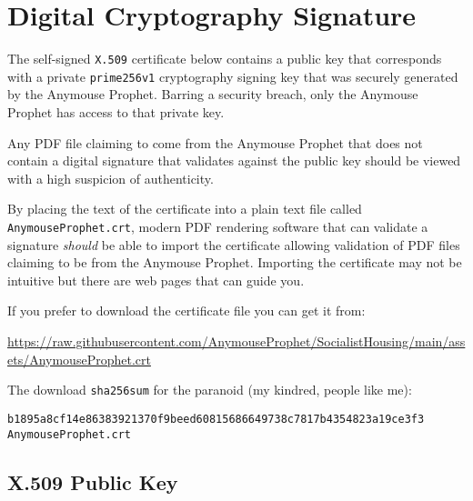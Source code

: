 \cleardoublepage %
\section*{Digital Cryptography Signature}
\hypertarget{cryptsig}{}


The self-signed \texttt{X.509} certificate below contains a public key that corresponds with a private \texttt{prime256v1} cryptography signing key that was securely generated by the Anymouse Prophet. Barring a security breach, only the Anymouse Prophet has access to that private key.

Any PDF file claiming to come from the Anymouse Prophet that does not contain a digital signature that validates against the public key should be viewed with a high suspicion of authenticity.

By placing the text of the certificate into a plain text file called \texttt{AnymouseProphet.crt}, modern PDF rendering software that can validate a signature \emph{should} be able to import the certificate allowing validation of PDF files claiming to be from the Anymouse Prophet. Importing the certificate may not be intuitive but there are web pages that can guide you.

If you prefer to download the certificate file you can get it from:

\bigskip

\url{https://raw.githubusercontent.com/AnymouseProphet/SocialistHousing/main/assets/AnymouseProphet.crt}

\bigskip

The download \texttt{sha256sum} for the paranoid (my kindred, people like me):

\makeatletter
\newcommand{\verbatimfont}[1]{\renewcommand{\verbatim@font}{\ttfamily#1}}
\makeatother

\verbatimfont{\footnotesize}%
\begin{verbatim}
b1895a8cf14e86383921370f9beed60815686649738c7817b4354823a19ce3f3  AnymouseProphet.crt
\end{verbatim}

\subsection*{X.509 Public Key}

